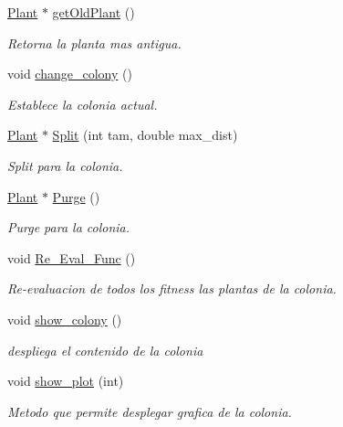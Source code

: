 \begin{DoxyCompactItemize}
\hyperlink{class_plant}{Plant} $\ast$ \hyperlink{class_colony_a911588b5aab6106b94e9a039ffd61060}{get\+Old\+Plant} ()
\begin{DoxyCompactList}\small\item\em Retorna la planta mas antigua. \end{DoxyCompactList}\item 
\hypertarget{class_colony_add10150a1003dbf88bd9e878509b5367}{void \hyperlink{class_colony_add10150a1003dbf88bd9e878509b5367}{change\+\_\+colony} ()}\label{class_colony_add10150a1003dbf88bd9e878509b5367}

\begin{DoxyCompactList}\small\item\em Establece la colonia actual. \end{DoxyCompactList}\item 
\hyperlink{class_plant}{Plant} $\ast$ \hyperlink{class_colony_a665b63676510d72cc12d4a658f795dff}{Split} (int tam, double max\+\_\+dist)
\begin{DoxyCompactList}\small\item\em Split para la colonia. \end{DoxyCompactList}\item 
\hyperlink{class_plant}{Plant} $\ast$ \hyperlink{class_colony_a8ce65c7c0abc9edee880ff6275b51e6f}{Purge} ()
\begin{DoxyCompactList}\small\item\em Purge para la colonia. \end{DoxyCompactList}\item 
\hypertarget{class_colony_a5a8aa21bceba4eb522333bbb964a7563}{void \hyperlink{class_colony_a5a8aa21bceba4eb522333bbb964a7563}{Re\+\_\+\+Eval\+\_\+\+Func} ()}\label{class_colony_a5a8aa21bceba4eb522333bbb964a7563}

\begin{DoxyCompactList}\small\item\em Re-\/evaluacion de todos los fitness las plantas de la colonia. \end{DoxyCompactList}\item 
\hypertarget{class_colony_a6a6528cacc995800e343298f3a10715f}{void \hyperlink{class_colony_a6a6528cacc995800e343298f3a10715f}{show\+\_\+colony} ()}\label{class_colony_a6a6528cacc995800e343298f3a10715f}

\begin{DoxyCompactList}\small\item\em despliega el contenido de la colonia \end{DoxyCompactList}\item 
void \hyperlink{class_colony_a9b1ac80bb274d2f8b90e592d11a4894b}{show\+\_\+plot} (int)
\begin{DoxyCompactList}\small\item\em Metodo que permite desplegar grafica de la colonia. \end{DoxyCompactList}\end{DoxyCompactItemize}


